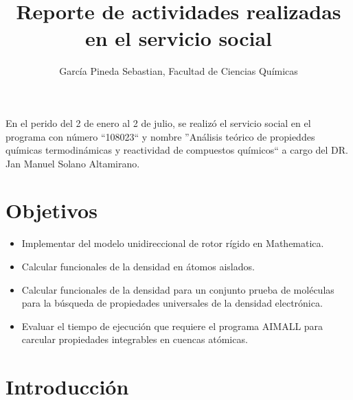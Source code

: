 \documentclass[12pt,letterpaper]{article}
\title{Reporte de actividades realizadas en el servicio social}
\author{García Pineda Sebastian, Facultad de Ciencias Químicas}
\date{}
\begin{document}
\renewcommand{\figurename}{Figura}
\renewcommand{\tablename}{Tabla}
\maketitle
En el perido del 2 de enero al 2 de julio, 
se realizó el servicio social en el programa con número
``108023`` y nombre
''Análisis teórico de propieddes químicas termodinámicas y reactividad de compuestos químicos`` a cargo del 
DR. Jan Manuel Solano Altamirano.\\


\section{Objetivos}
\begin{itemize}


\item Implementar del modelo unidireccional de rotor rígido en Mathematica.\\

\item Calcular funcionales de la densidad en átomos aislados.\\

\item Calcular funcionales de la densidad para un conjunto prueba de moléculas para la búsqueda de propiedades universales de la densidad electrónica.\\

\item Evaluar el tiempo de ejecución que requiere el programa AIMALL para carcular propiedades integrables en cuencas atómicas.\\
 
\end{itemize}

\section{Introducción}
\end{document}

